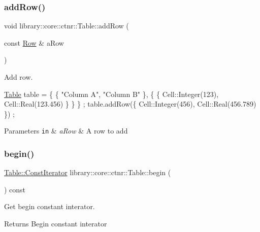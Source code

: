 \subsubsection{\texorpdfstring{add\+Row()}{addRow()}}
{\footnotesize\ttfamily void library\+::core\+::ctnr\+::\+Table\+::add\+Row (\begin{DoxyParamCaption}\item[{const \hyperlink{classlibrary_1_1core_1_1ctnr_1_1table_1_1_row}{Row} \&}]{a\+Row }\end{DoxyParamCaption})}



Add row. 


\begin{DoxyCode}
\hyperlink{classlibrary_1_1core_1_1ctnr_1_1_table_a5b11121caa4288c3da642af7c6a5a632}{Table} table = \{ \{ \textcolor{stringliteral}{"Column A"}, \textcolor{stringliteral}{"Column B"} \}, \{ \{ Cell::Integer(123), Cell::Real(123.456) \} \} \} ;
table.addRow(\{ Cell::Integer(456), Cell::Real(456.789) \}) ;
\end{DoxyCode}



\begin{DoxyParams}[1]{Parameters}
\mbox{\tt in}  & {\em a\+Row} & A row to add \\
\hline
\end{DoxyParams}
\mbox{\label{classlibrary_1_1core_1_1ctnr_1_1_table_ad9a420d9759797e8e8d9142da502a6c8}} 
\subsubsection{\texorpdfstring{begin()}{begin()}}
{\footnotesize\ttfamily \hyperlink{classlibrary_1_1core_1_1ctnr_1_1_table_a7fa78ad4e7e8d27ceab0bff51ab84fc3}{Table\+::\+Const\+Iterator} library\+::core\+::ctnr\+::\+Table\+::begin (\begin{DoxyParamCaption}{ }\end{DoxyParamCaption}) const}



Get begin constant interator. 

\begin{DoxyReturn}{Returns}
Begin constant interator 
\end{DoxyReturn}
\mbox{\label{classlibrary_1_1core_1_1ctnr_1_1_table_a82b89b7d22f40518054f6d507660e8b5}} 
